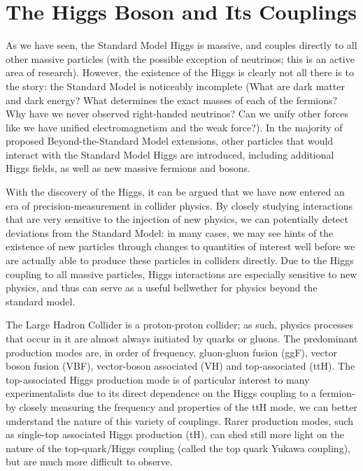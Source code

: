 \section{The Higgs Boson and Its Couplings} \label{sec:Higgs Couplings} 

As we have seen, the Standard Model Higgs is massive, and couples directly to all other massive particles (with the possible exception of neutrinos; this is an active area of research). However, the existence of the Higgs is clearly not all there is to the story: the Standard Model is noticeably incomplete (What are dark matter and dark energy? What determines the exact masses of each of the fermions? Why have we never observed right-handed neutrinos? Can we unify other forces like we have unified electromagnetism and the weak force?). In the majority of proposed Beyond-the-Standard Model extensions, other particles that would interact with the Standard Model Higgs are introduced, including additional Higgs fields, as well as new massive fermions and bosons.

With the discovery of the Higgs, it can be argued that we have now entered an era of precision-measurement in collider physics. By closely studying interactions that are very sensitive to the injection of new physics, we can potentially detect deviations from the Standard Model: in many cases, we may see hints of the existence of new particles through changes to quantities of interest well before we are actually able to produce these particles in colliders directly. Due to the Higgs coupling to all massive particles, Higgs interactions are especially sensitive to new physics, and thus can serve as a useful bellwether for physics beyond the standard model.

The Large Hadron Collider is a proton-proton collider; as such, physics processes that occur in it are almost always initiated by quarks or gluons. The predominant production modes are, in order of frequency, gluon-gluon fusion (ggF), vector boson fusion (VBF), vector-boson 
associated (VH) and top-associated (ttH). The top-associated Higgs production mode is of particular interest to many experimentalists due to its direct dependence on the Higgs coupling to a fermion- by closely measuring the frequency and properties of the ttH mode, we can better understand the nature of this variety of couplings. Rarer production modes, such as single-top associated Higgs production (tH), can shed still more light on the nature of the top-quark/Higgs coupling (called the top quark Yukawa coupling), but are much more difficult to observe.

